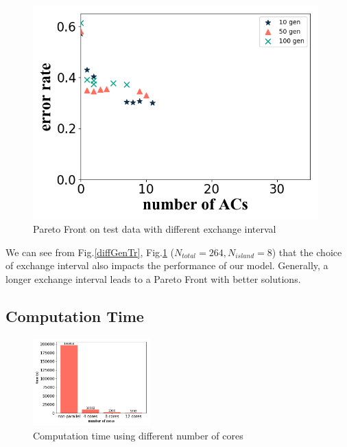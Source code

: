 \documentclass[conference]{IEEEtran}
\begin{document}
\begin{figure}[H]
    \begin{minipage}[t]{0.25\textwidth}
    \includegraphics[width=0.98\textwidth]{figures/diffGenTest3.png}
    \end{minipage}
    \caption{Pareto Front on test data with different exchange interval}
    \label{diffGenT}
  \end{figure}
 We can see from Fig.\ref{diffGenTr}, Fig.\ref{diffGenT} ($N_{total} = 264, N_{island} = 8$) that the choice of exchange interval also impacts the performance of our model. Generally, a longer exchange interval leads to a Pareto Front with better solutions.


  



\subsection{Computation Time}

\begin{figure}[htbp]
  \centering
  \includegraphics[width=0.4\textwidth]{figures/diffTime.png}
  \caption{Computation time using different number of cores}\label{phT}
\end{figure}
\end{document}

